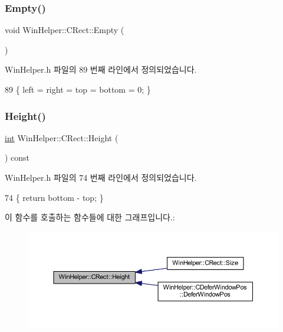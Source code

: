 \subsubsection{\texorpdfstring{Empty()}{Empty()}}
{\footnotesize\ttfamily void Win\+Helper\+::\+C\+Rect\+::\+Empty (\begin{DoxyParamCaption}{ }\end{DoxyParamCaption})\hspace{0.3cm}{\ttfamily [inline]}}



Win\+Helper.\+h 파일의 89 번째 라인에서 정의되었습니다.


\begin{DoxyCode}
89 \{ left = right = top = bottom = 0; \}
\end{DoxyCode}
\mbox{\label{class_win_helper_1_1_c_rect_a227070170fb6da9f8539eb9d35749745}} 
\subsubsection{\texorpdfstring{Height()}{Height()}}
{\footnotesize\ttfamily \mbox{\hyperlink{_util_8cpp_a0ef32aa8672df19503a49fab2d0c8071}{int}} Win\+Helper\+::\+C\+Rect\+::\+Height (\begin{DoxyParamCaption}{ }\end{DoxyParamCaption}) const\hspace{0.3cm}{\ttfamily [inline]}}



Win\+Helper.\+h 파일의 74 번째 라인에서 정의되었습니다.


\begin{DoxyCode}
74 \{ \textcolor{keywordflow}{return} bottom - top; \}
\end{DoxyCode}
이 함수를 호출하는 함수들에 대한 그래프입니다.\+:
\nopagebreak
\begin{figure}[H]
\begin{center}
\leavevmode
\includegraphics[width=350pt]{class_win_helper_1_1_c_rect_a227070170fb6da9f8539eb9d35749745_icgraph}
\end{center}
\end{figure}
\mbox{\label{class_win_helper_1_1_c_rect_a360524ba4e46d6ff65f8e6fa2ee7ef6a}} 
